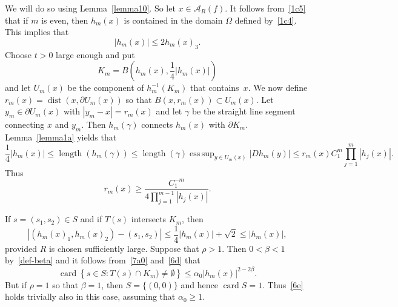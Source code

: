 \documentclass[12pt,a4paper]{amsart}
\theoremstyle{plain}
\theoremstyle{definition}
\theoremstyle{remark}
\DeclareMathOperator*{\esssup}{ess\,sup}
\def\cA{\mathcal A}
\def\dist{\operatorname{dist}}
\def\length{\operatorname{length}}
\def\card{\operatorname{card}}
\numberwithin{equation}{section}
\begin{document}
We will do so using Lemma~\ref{lemma10}.
So let $x\in \cA_R(f)$.
It follows from~\eqref{1c5} that if $m$ is even, then $h_m(x)$ is contained in 
the domain $\Omega$ defined by~\eqref{1c4}.
This implies that 
\begin{equation}\label{6a}
|h_m(x)|\leq 2 h_m(x)_3.
\end{equation}
Choose  $t>0$ large enough  and put 
\begin{equation}\label{6a1}
K_m=B\!\left(h_m(x),\frac14 |h_m(x)|\right)
\end{equation}
and let $U_m(x)$ be the component of $h_m^{-1}(K_m)$ that contains~$x$.
We now define $r_m(x)=\dist(x,\partial U_m(x))$ so that $B(x,r_m(x))\subset U_m(x)$.
Let $y_m\in\partial U_m(x)$ with $|y_m-x|=r_m(x)$ and let
$\gamma$ be the straight line segment connecting $x$ and $y_m$.
Then $h_m(\gamma)$ connects $h_m(x)$ with $\partial K_m$.
Lemma~\ref{lemma1a} yields that
\begin{equation}\label{6b}
\frac14 |h_m(x)| \leq \length (h_m(\gamma) )
\leq \length(\gamma) \esssup_{y\in U_m(x)} |Dh_{m}(y)|
\leq r_m(x) C_1^{m} \prod_{j=1}^{m} |h_j(x)|.
\end{equation}
Thus 
\begin{equation}\label{6c}
r_m(x)\geq \frac{C_1^{-m}}{4 \prod_{j=1}^{m-1} |h_j(x)|}.
\end{equation}

If $s=(s_1,s_2)\in S$ and if $T(s)$ intersects $K_m$, then
\begin{equation}\label{6d}
|(h_m(x)_1,h_m(x)_2)-(s_1,s_2)|\leq \frac14 |h_m(x)| +\sqrt{2}\leq |h_m(x)|,
\end{equation}
provided $R$ is chosen sufficiently large.
Suppose that $\rho>1$. Then 
$0<\beta<1$ by~\eqref{def-beta} and 
it follows from~\eqref{7a0} and~\eqref{6d} that
\begin{equation}\label{6e}
\card\!\left\{s\in S\colon T(s)\cap K_m)\neq\emptyset \right\}
\leq \alpha_0 |h_m(x)|^{2-2\beta} .
\end{equation}
But if $\rho=1$ so that $\beta=1$,
then $S=\{(0,0)\}$ and hence $\card S=1$. Thus~\eqref{6e} holds
trivially also in this case, assuming that $\alpha_0\geq 1$.
\end{document}
